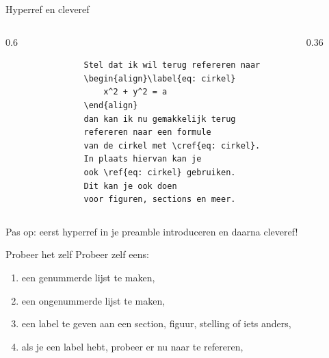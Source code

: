 \begin{frame}[fragile, t]{Hyperref en cleveref}
	\begin{columns}[t]
		\hspace{-0.6\textwidth}
		\begin{column}{0.6\textwidth}
			\begin{verbatim}
				Stel dat ik wil terug refereren naar 
				\begin{align}\label{eq: cirkel}
					x^2 + y^2 = a
				\end{align}
				dan kan ik nu gemakkelijk terug 
				refereren naar een formule 
				van de cirkel met \cref{eq: cirkel}.
				In plaats hiervan kan je
				ook \ref{eq: cirkel} gebruiken.
				Dit kan je ook doen 
				voor figuren, sections en meer.
			\end{verbatim}
			\par
		\end{column}
		
		\hspace{0.7\textwidth}
		\begin{column}{0.36\textwidth}
			\vspace{1mm}
		\end{column}
	\end{columns}
	\vspace{0.5cm}
	Pas op: eerst hyperref in je preamble introduceren en daarna cleveref!
\end{frame}

\begin{frame}{Probeer het zelf}
	Probeer zelf eens: 
	\begin{enumerate}[label=\roman*.]
		\item een genummerde lijst te maken,
		\item een ongenummerde lijst te maken,
		\item een label te geven aan een section, figuur, stelling of iets anders,
		\item als je een label hebt, probeer er nu naar te refereren,
	\end{enumerate}
\end{frame}